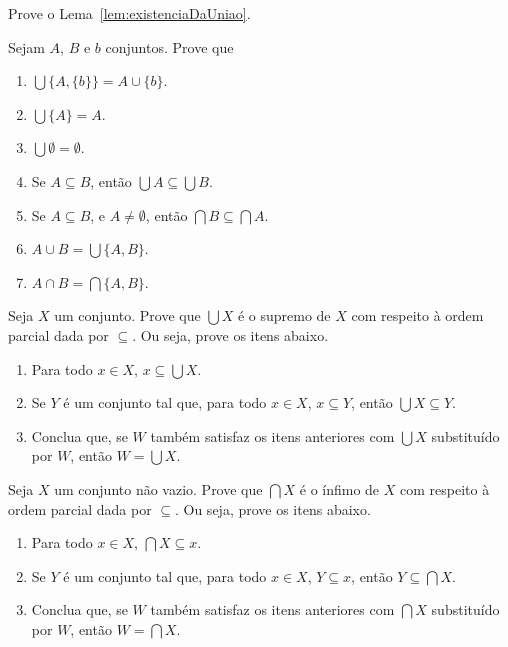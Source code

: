 \begin{exercise}\label{exr:existenciaDaUniao}
    Prove o Lema~\ref{lem:existenciaDaUniao}.
\end{exercise}

\begin{exercise}
    Sejam $A$, $B$ e $b$ conjuntos.
    Prove que
    \begin{enumerate}[label=(\alph*)]
        \item $\bigcup \{A,\{b\}\}=A\cup\{b\}$.
        \item $\bigcup \{A\} = A$.
        \item $\bigcup \emptyset = \emptyset$.
        \item Se $A\subseteq B$, então $\bigcup A \subseteq \bigcup B$.
        \item Se $A\subseteq B$, e $A\neq \emptyset$, então $\bigcap B \subseteq \bigcap A$.
        \item $A\cup B = \bigcup \{A, B\}$.
        \item $A\cap B = \bigcap \{A, B\}$.
    \end{enumerate}
\end{exercise}

\begin{exercise}
    Seja $X$ um conjunto.
    Prove que $\bigcup X$ é o supremo de $X$ com respeito à ordem parcial dada por $\subseteq$.
    Ou seja, prove os itens abaixo.
    \begin{enumerate}
        \item Para todo $x \in X$, $x \subseteq \bigcup X$.
        \item Se $Y$ é um conjunto tal que, para todo $x \in X$, $x \subseteq Y$, então $\bigcup X \subseteq Y$.
        \item Conclua que, se $W$ também satisfaz os itens anteriores com $\bigcup X$ substituído por $W$, então $W=\bigcup X$.
    \end{enumerate}
\end{exercise}

\begin{exercise}
    Seja $X$ um conjunto não vazio.
    Prove que $\bigcap X$ é o ínfimo de $X$ com respeito à ordem parcial dada por $\subseteq$.
    Ou seja, prove os itens abaixo.
    \begin{enumerate}
        \item Para todo $x \in X$, $\bigcap X \subseteq x$.
        \item Se $Y$ é um conjunto tal que, para todo $x \in X$, $Y \subseteq x$, então $Y \subseteq \bigcap X$.
        \item Conclua que, se $W$ também satisfaz os itens anteriores com $\bigcap X$ substituído por $W$, então $W=\bigcap X$.
    \end{enumerate}
\end{exercise}

